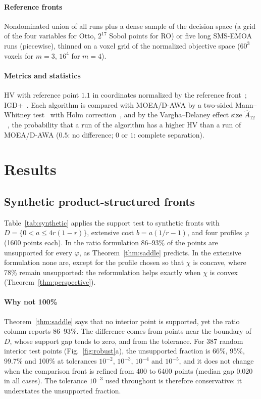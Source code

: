 \documentclass[journal]{IEEEtran}
\theoremstyle{remark}
\begin{document}
\paragraph*{Reference fronts} Nondominated union of all runs plus a dense sample of the decision space
(a grid of the four variables for Otto, $2^{17}$ Sobol points for RO) or five long SMS-EMOA runs
(piecewise), thinned on a voxel grid of the normalized objective space ($60^3$ voxels for $m = 3$,
$16^4$ for $m = 4$).

\paragraph*{Metrics and statistics} HV with reference point $1.1$ in coordinates normalized by the
reference front~\cite{Zitzler1999}; IGD+~\cite{Ishibuchi2015}. Each algorithm is compared with
MOEA/D-AWA by a two-sided Mann--Whitney test~\cite{MannWhitney1947} with Holm
correction~\cite{Holm1979}, and by the Vargha--Delaney effect size
$\hat A_{12}$~\cite{VarghaDelaney2000}, the probability that a run of the algorithm has a higher HV than a
run of MOEA/D-AWA ($0.5$: no difference; $0$ or $1$: complete separation).

\section{Results}
\label{sec:results}

\subsection{Synthetic product-structured fronts}

Table~\ref{tab:synthetic} applies the support test to synthetic fronts with
$D = \{0 < a \le 4r(1-r)\}$, extensive cost $b = a(1/r - 1)$, and four profiles $\varphi$ (1600
points each). In the ratio formulation 86--93\% of the points are unsupported for every $\varphi$, as
Theorem~\ref{thm:saddle} predicts. In the extensive formulation none are, except for the profile
chosen so that $\chi$ is concave, where 78\% remain unsupported: the reformulation helps exactly when
$\chi$ is convex (Theorem~\ref{thm:perspective}).

\paragraph*{Why not 100\%} Theorem~\ref{thm:saddle} says that no interior point is supported, yet the
ratio column reports 86--93\%. The difference comes from points near the boundary of $D$, whose support
gap tends to zero, and from the tolerance. For 387 random interior test points
(Fig.~\ref{fig:robust}a), the unsupported fraction is 66\%, 95\%, 99.7\% and 100\% at tolerances
$10^{-2}$, $10^{-3}$, $10^{-4}$ and $10^{-5}$, and it does not change when the comparison front is
refined from 400 to 6400 points (median gap $0.020$ in all cases). The tolerance $10^{-3}$ used
throughout is therefore conservative: it understates the unsupported fraction.
\end{document}
